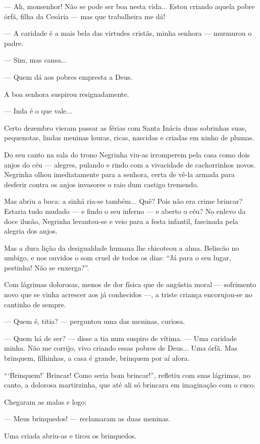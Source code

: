 --- Ah, monsenhor! Não se pode ser boa nesta vida... Estou criando
aquela pobre órfã, filha da Cesária --- mas que trabalheira me dá!

--- A caridade é a mais bela das virtudes cristãs, minha senhora ---
murmurou o padre.

--- Sim, mas cansa...

--- Quem dá aos pobres empresta a Deus.

A boa senhora suspirou resignadamente.

--- Inda é o que vale...

Certo dezembro vieram passar as férias com Santa Inácia duas sobrinhas
suas, pequenotas, lindas meninas louras, ricas, nascidas e criadas em
ninho de plumas.

Do seu canto na sala do trono Negrinha viu-as irromperem pela casa como
dois anjos do céu --- alegres, pulando e rindo com a vivacidade de
cachorrinhos novos. Negrinha olhou imediatamente para a senhora, certa
de vê-la armada para desferir contra os anjos invasores o raio dum
castigo tremendo.

Mas abriu a boca: a sinhá ria-se também... Quê? Pois não era crime
brincar? Estaria tudo mudado --- e findo o seu inferno --- e aberto o
céu? No enlevo da doce ilusão, Negrinha levantou-se e veio para a festa
infantil, fascinada pela alegria dos anjos.

Mas a dura lição da desigualdade humana lhe chicoteou a alma. Beliscão
no umbigo, e nos ouvidos o som cruel de todos os dias: ``Já para o seu
lugar, pestinha! Não se enxerga?''.

Com lágrimas dolorosas, menos de dor física que de angústia moral ---
sofrimento novo que se vinha acrescer aos já conhecidos ---, a triste
criança encorujou-se no cantinho de sempre.

--- Quem é, titia? --- perguntou uma das meninas, curiosa.

--- Quem há de ser? --- disse a tia num suspiro de vítima. --- Uma
caridade minha. Não me corrijo, vivo criando essas pobres de Deus... Uma
órfã. Mas brinquem, filhinhas, a casa é grande, brinquem por aí afora.

```Brinquem!' Brincar! Como seria bom brincar!'', refletiu com suas
lágrimas, no canto, a dolorosa martirzinha, que até ali só brincara em
imaginação com o cuco.

Chegaram as malas e logo:

--- Meus brinquedos! --- reclamaram as duas meninas.

Uma criada abriu-as e tirou os brinquedos.

